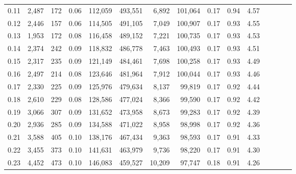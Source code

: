 \begin{tabular}{rrrcrrrrrrrrrrr}
0.11 &   2,487 &     172 &                                       0.06 &  112,059 &  493,551 &    6,892 &  101,064 &  0.17 &  0.94 &                         4.57 \\
0.12 &   2,446 &     157 &                                       0.06 &  114,505 &  491,105 &    7,049 &  100,907 &  0.17 &  0.93 &                         4.55 \\
0.13 &   1,953 &     172 &                                       0.08 &  116,458 &  489,152 &    7,221 &  100,735 &  0.17 &  0.93 &                         4.53 \\
0.14 &   2,374 &     242 &                                       0.09 &  118,832 &  486,778 &    7,463 &  100,493 &  0.17 &  0.93 &                         4.51 \\
0.15 &   2,317 &     235 &                                       0.09 &  121,149 &  484,461 &    7,698 &  100,258 &  0.17 &  0.93 &                         4.49 \\
0.16 &   2,497 &     214 &                                       0.08 &  123,646 &  481,964 &    7,912 &  100,044 &  0.17 &  0.93 &                         4.46 \\
0.17 &   2,330 &     225 &                                       0.09 &  125,976 &  479,634 &    8,137 &   99,819 &  0.17 &  0.92 &                         4.44 \\
0.18 &   2,610 &     229 &                                       0.08 &  128,586 &  477,024 &    8,366 &   99,590 &  0.17 &  0.92 &                         4.42 \\
0.19 &   3,066 &     307 &                                       0.09 &  131,652 &  473,958 &    8,673 &   99,283 &  0.17 &  0.92 &                         4.39 \\
0.20 &   2,936 &     285 &                                       0.09 &  134,588 &  471,022 &    8,958 &   98,998 &  0.17 &  0.92 &                         4.36 \\
0.21 &   3,588 &     405 &                                       0.10 &  138,176 &  467,434 &    9,363 &   98,593 &  0.17 &  0.91 &                         4.33 \\
0.22 &   3,455 &     373 &                                       0.10 &  141,631 &  463,979 &    9,736 &   98,220 &  0.17 &  0.91 &                         4.30 \\
0.23 &   4,452 &     473 &                                       0.10 &  146,083 &  459,527 &   10,209 &   97,747 &  0.18 &  0.91 &                         4.26 \\

\end{tabular}
